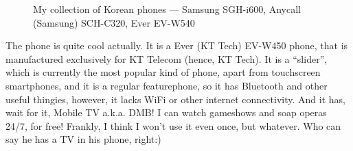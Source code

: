 \begin{post}
\begin{content}
\begin{figure}
\centering{}
\caption{My collection of Korean phones --- Samsung SGH-i600, Anycall (Samsung) SCH-C320, Ever EV-W540}
\end{figure}The phone is quite cool actually. It is a Ever (KT Tech) EV-W450 phone, that is manufactured exclusively for KT Telecom (hence, KT Tech). It is a ``slider'', which is currently the most popular kind of phone, apart from touchscreen smartphones, and it is a regular featurephone, so it has Bluetooth and other useful thingies, however, it lacks WiFi or other internet connectivity. And it has, wait for it, Mobile TV a.k.a. DMB! I can watch gameshows and soap operas 24/7, for free! Frankly, I think I won't use it even once, but whatever. Who can say he has a TV in his phone, right:)
	\end{content}
\end{post}
